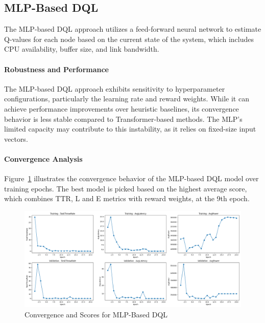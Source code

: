 \documentclass[preprint,3p,authoryear]{elsarticle}
\begin{document}
\subsection{MLP-Based DQL}\label{subsec:mlp_perf}

The MLP-based DQL approach utilizes a feed-forward neural network to estimate Q-values for each node based on the current state of the system, which includes CPU availability, buffer size, and link bandwidth. 

\paragraph{Robustness and Performance}

The MLP-based DQL approach exhibits sensitivity to hyperparameter configurations, particularly the learning rate and reward weights. While it can achieve performance improvements over heuristic baselines, its convergence behavior is less stable compared to Transformer-based methods. The MLP's limited capacity may contribute to this instability, as it relies on fixed-size input vectors.


\paragraph{Convergence Analysis}

Figure~\ref{fig:mlp-score-plot} illustrates the convergence behavior of the MLP-based DQL model over training epochs. The best model is picked based on the highest average score, which combines TTR, L and E metrics with reward weights, at the 9th epoch. 

\begin{figure}[H]
    \centering
    \includegraphics[width=1\linewidth]{figs/MLP/score_plot.png}
    \caption{Convergence and Scores for MLP-Based DQL}\label{fig:mlp-score-plot}
\end{figure}
\end{document}
